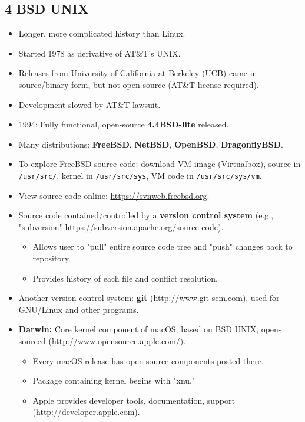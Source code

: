 \documentclass{article}
\begin{document}
\subsection*{4 BSD UNIX}
\begin{itemize}
    \item Longer, more complicated history than Linux.
    \item Started 1978 as derivative of AT\&T's UNIX.
    \item Releases from University of California at Berkeley (UCB) came in source/binary form, but not open source (AT\&T license required).
    \item Development slowed by AT\&T lawsuit.
    \item 1994: Fully functional, open-source \textbf{4.4BSD-lite} released.
    \item Many distributions: \textbf{FreeBSD}, \textbf{NetBSD}, \textbf{OpenBSD}, \textbf{DragonflyBSD}.
    \item To explore FreeBSD source code: download VM image (Virtualbox), source in \texttt{/usr/src/}, kernel in \texttt{/usr/src/sys}, VM code in \texttt{/usr/src/sys/vm}.
    \item View source code online: \url{https://svnweb.freebsd.org}.
    \item Source code contained/controlled by a \textbf{version control system} (e.g., "subversion" \url{https://subversion.apache.org/source-code}).
    \begin{itemize}
        \item Allows user to "pull" entire source code tree and "push" changes back to repository.
        \item Provides history of each file and conflict resolution.
    \end{itemize}
    \item Another version control system: \textbf{git} (\url{http://www.git-scm.com}), used for GNU/Linux and other programs.
    \item \textbf{Darwin:} Core kernel component of macOS, based on BSD UNIX, open-sourced (\url{http://www.opensource.apple.com/}).
    \begin{itemize}
        \item Every macOS release has open-source components posted there.
        \item Package containing kernel begins with "xnu."
        \item Apple provides developer tools, documentation, support (\url{http://developer.apple.com}).
    \end{itemize}
\end{itemize}
\end{document}
